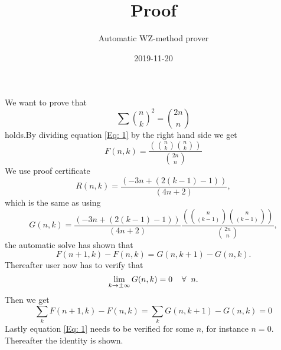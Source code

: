 \documentclass{article}
\title{Proof}
\author{Automatic WZ-method prover}
\date{2019-11-20}
\let\oldforall\forall
\renewcommand{\forall}{\hspace*{2mm}\oldforall\hspace*{1mm}}
\begin{document}
\maketitle
We want to prove that
\begin{equation}\label{Eq: 1}
\sum \binom{n}{k}^2 = \binom{2n}{n}
\end{equation}
holds.By dividing equation \ref{Eq: 1} by the right hand side we get
\begin{equation}
F(n,k)=\frac{(\binom{n}{k}\binom{n}{k})}{\binom{2n}{n}}
\end{equation}
We use proof certificate
\begin{equation}
R(n,k)=\frac{(-3n+(2(k-1)-1))}{(4n+2)},
\end{equation}
which is the same as using
\begin{equation}
G(n,k)=\frac{(-3n+(2(k-1)-1))}{(4n+2)}\frac{(\binom{n}{(k-1)}\binom{n}{(k-1)})}{\binom{2n}{n}},
\end{equation}
the automatic solve has  shown that
\begin{equation}\label{Eq: WZ1}
F(n+1,k)-F(n,k)=G(n,k+1)-G(n,k).
\end{equation}
Thereafter user now has to verify that
\begin{equation}
\lim_{k\to\pm\infty}G(n,k)=0\forall n.
\end{equation}
Then we get
\begin{equation}
\sum_k F(n+1,k)-F(n,k)=\sum_k G(n,k+1)-G(n,k)=0\end{equation}Lastly equation \ref{Eq: 1} needs to be verified for some $n$, for instance $n=0$. Thereafter the identity is shown.
\end{document}
